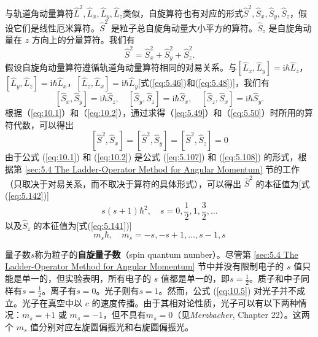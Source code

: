     与轨道角动量算符$\hat{L}^2, \hat{L}_x, \hat{L}_y, \hat{L}_z$类似，自旋算符也有对应的形式$\hat{S}^2, \hat{S}_x, \hat{S}_y, \hat{S}_z$，假设它们是线性厄米算符。$\hat{S}^2$ 是粒子总自旋角动量大小平方的算符。$\hat{S}_z$ 是自旋角动量在 $z$ 方向上的分量算符。我们有
    \begin{equation}
        \hat{S}^2 = \hat{S}_x^2 + \hat{S}_y^2 + \hat{S}_z^2.
        \label{eq:10.1}
    \end{equation}
    假设自旋角动量算符遵循轨道角动量算符相同的对易关系。与$\left[\hat{L}_x, \hat{L}_y\right] = \mathrm{i} \hbar \hat{L}_z$，$\left[\hat{L}_y, \hat{L}_z\right] = \mathrm{i} \hbar \hat{L}_x$，$\left[\hat{L}_z, \hat{L}_x\right] = \mathrm{i} \hbar \hat{L}_y$[式(\ref{eq:5.46})和(\ref{eq:5.48})]，我们有
    \begin{equation}
        \left[\hat{S}_x, \hat{S}_y\right] = \mathrm{i} \hbar \hat{S}_z, \quad
        \left[\hat{S}_y, \hat{S}_z\right] = \mathrm{i} \hbar \hat{S}_x, \quad
        \left[\hat{S}_z, \hat{S}_x\right] = \mathrm{i} \hbar \hat{S}_y.
        \label{eq:10.2}
    \end{equation}
    根据（\ref{eq:10.1}）和（\ref{eq:10.2}），通过求得（\ref{eq:5.49}）和（\ref{eq:5.50}）时所用的算符代数，可以得出
    \begin{equation}
        \left[\hat{S}^2, \hat{S}_x\right] = \left[\hat{S}^2, \hat{S}_y\right] = \left[\hat{S}^2, \hat{S}_z\right] = 0
        \label{eq:10.3}
    \end{equation}
    由于公式 (\ref{eq:10.1}) 和 (\ref{eq:10.2}) 是公式 (\ref{eq:5.107}) 和 (\ref{eq:5.108}) 的形式，根据第 \ref{sec:5.4 The Ladder-Operator Method for Angular Momentum} 节的工作（只取决于对易关系，而不取决于算符的具体形式），可以得出 $\hat{S}^2$ 的本征值为[式(\ref{eq:5.142})]
    \begin{equation}
        \boxed{
            s\left(s+1\right)\hbar^2, \quad s = 0, \frac{1}{2}, 1, \frac{3}{2}, \ldots
        }
        \label{eq:10.4}
    \end{equation}
    以及$\hat{S}_z$ 的本征值为[式(\ref{eq:5.141})]
    \begin{equation}
        \boxed{
            m_s\hbar, \quad m_s = -s, -s+1, \ldots, s-1, s
        }
        \label{eq:10.5}
    \end{equation}

    量子数$s$称为粒子的\textbf{自旋量子数}（spin quantum number）。尽管第 \ref{sec:5.4 The Ladder-Operator Method for Angular Momentum} 节中并没有限制电子的 $s$ 值只能是单一的，但实验表明，所有电子的 $s$ 值都是单一的，即$s = \frac{1}{2}$。质子和中子同样有$s = \frac{1}{2}$。离子有$s = 0$。光子则有$s=1$。然而，公式 (\ref{eq:10.5}) 对光子并不成立。光子在真空中以 $c$ 的速度传播。由于其相对论性质，光子可以有以下两种情况：$m_s = +1$ 或 $m_s = -1$，但不具有$m_s = 0$（见\textit{Merzbacher}, Chapter 22）。这两个 $m_s$ 值分别对应左旋圆偏振光和右旋圆偏振光。

